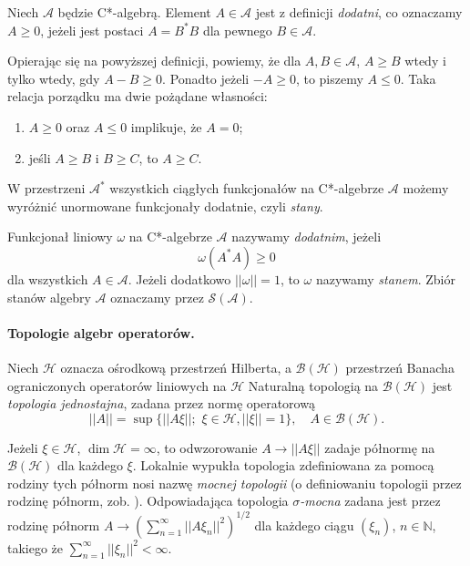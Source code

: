 \begin{Definition}
 Niech $\mathcal{A}$ będzie C*-algebrą. Element $A \in \mathcal{A}$ jest z
definicji \emph{dodatni}, co oznaczamy $A \geq 0$, jeżeli jest postaci
$A = B^{*}B$ dla pewnego $B \in \mathcal{A}$.
\end{Definition}

Opierając się na powyższej definicji, powiemy, że dla $A, B \in \mathcal{A}$,
$A \geq B$ wtedy i tylko wtedy, gdy $A-B \geq 0$. Ponadto jeżeli $-A
\geq 0$, to piszemy $A \leq 0$.
Taka relacja porządku ma dwie
pożądane własności:
\begin{enumerate}
 \item $A \geq 0$ oraz $A \leq 0$ implikuje, że $A =0$;
 \item jeśli $A \geq B$ i $B \geq C$, to $A \geq C$.
\end{enumerate}

W przestrzeni $\mathcal{A}^{*}$ wszystkich ciągłych funkcjonałów na
C*-algebrze $\mathcal{A}$ możemy wyróżnić unormowane funkcjonały dodatnie,
czyli \emph{stany}.

\begin{Definition}
 \label{def:stateOnCalg}
  Funkcjonał liniowy $\omega$ na C*-algebrze $\mathcal{A}$ nazywamy
\emph{dodatnim}, jeżeli
\begin{equation}
 \label{eq:stateOnCalg}
  \omega(A^{*}A) \geq 0
\end{equation}
dla wszystkich $A \in \mathcal{A}$.
Jeżeli dodatkowo $||\omega|| = 1$, to $\omega$ nazywamy \emph{stanem}.
Zbiór stanów algebry $\mathcal{A}$ oznaczamy przez $\mathcal{S}(\mathcal{A})$.
\end{Definition}

\paragraph{Topologie algebr operatorów.}
Niech $\mathcal{H}$ oznacza ośrodkową przestrzeń Hilberta, a $\mathcal{B}(\mathcal{H})$ przestrzeń
Banacha ograniczonych operatorów liniowych na $\mathcal{H}$
Naturalną topologią na $\mathcal{B}(\mathcal{H})$ jest \emph{topologia jednostajna}, zadana
przez normę operatorową
\begin{equation}
 \label{eq:operatorNorm}
  ||A|| = %
  \sup \{ ||A\xi||; \, \, \xi \in \mathcal{H}, %
	    ||\xi|| = 1 \}, \quad A \in \mathcal{B}(\mathcal{H}).
\end{equation}

Jeżeli $\xi \in \mathcal{H}$,
$\dim \mathcal{H} \!=\! \infty$, to odwzorowanie $A \rightarrow
||A\xi||$ zadaje
półnormę na $\mathcal{B}(\mathcal{H})$ dla każdego $\xi$.
Lokalnie wypukła topologia zdefiniowana za
pomocą rodziny tych półnorm nosi nazwę \emph{mocnej topologii}
(o definiowaniu
topologii przez rodzinę półnorm, zob. \cite{Rudin1991}).
Odpowiadająca topologia \emph{$\sigma$-mocna} zadana jest przez
rodzinę półnorm
$A \rightarrow \left( \sum \limits_{n=1}^{\infty} ||A \xi_{n}||^{2} \right)^{1/2}$
dla każdego ciągu $(\xi_{n})$,
$n \in \mathbb{N}$, takiego że
$\sum \limits_{n=1}^{\infty} ||\xi_{n}||^{2} < \infty$.

